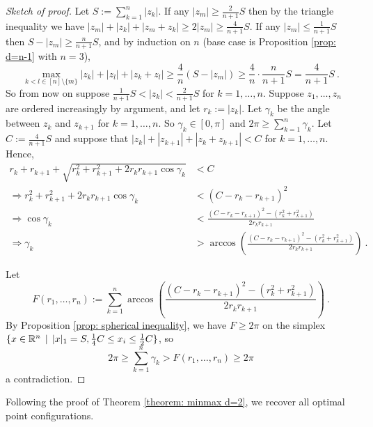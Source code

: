 \documentclass[reqno,hidelinks,11pt]{amsart}
\numberwithin{equation}{section}
\def\RR{\mathbb{R}}
\newcommand{\suchthat}{\;\ifnum\currentgrouptype=16 \middle\fi|\;}
\begin{document}
\begin{proof}[Sketch of proof]
    Let $S:=\sum_{k=1}^n|z_k|$.
    If any $|z_m|\ge\frac2{n+1}S$ then by the triangle inequality we have $|z_m|+|z_k|+|z_m+z_k|\ge2|z_m|\ge\frac4{n+1}S$.
    If any $|z_m|\le\frac1{n+1}S$ then $S-|z_m|\ge\frac{n}{n+1}S$, and by induction on $n$ (base case is Proposition \ref{prop: d=n-1} with $n=3$),
    \[
    \max_{k<l\in[n]\setminus\{m\}} |z_k|+|z_l|+|z_k+z_l|\ge\frac4{n}(S-|z_m|)\ge\frac4{n}\cdot\frac{n}{n+1}S=\frac4{n+1}S~.
    \]
    So from now on suppose $\frac1{n+1}S<|z_k|<\frac2{n+1}S$ for $k=1,\dots,n$.
    Suppose $z_1,\dots,z_n$ are ordered increasingly by argument, and let $r_k:=|z_k|$.
    Let $\gamma_k$ be the angle between $z_k$ and $z_{k+1}$ for $k=1,\dots,n$. So $\gamma_k\in[0,\pi]$ and $2\pi\ge\sum_{k=1}^n\gamma_k$. 
    Let $C:=\frac4{n+1}S$ and suppose that $|z_k|+|z_{k+1}|+|z_k+z_{k+1}|<C$ for $k=1,\dots,n$. Hence,
    \begin{align*}
        r_k+r_{k+1}+\sqrt{r_k^2+r_{k+1}^2+2r_kr_{k+1}\cos\gamma_k} &< C\\
        \Rightarrow r_k^2+r_{k+1}^2+2r_kr_{k+1}\cos\gamma_k &< (C-r_k-r_{k+1})^2\\
        \Rightarrow \cos\gamma_k &< \frac{(C-r_k-r_{k+1})^2-(r_k^2+r_{k+1}^2)}{2r_k r_{k+1}}\\
        \Rightarrow \gamma_k &> \arccos\left(\frac{(C-r_k-r_{k+1})^2-(r_k^2+r_{k+1}^2)}{2r_k r_{k+1}}\right)~.
    \end{align*}

    Let
    \[
    F(r_1,\dots,r_n):=\sum_{k=1}^n \arccos\left(\frac{(C-r_k-r_{k+1})^2-(r_k^2+r_{k+1}^2)}{2r_k r_{k+1}}\right)~.
    \]    
    By Proposition \ref{prop: spherical inequality}, we have $F\ge2\pi$ on the simplex $\{x\in\RR^n\, \suchthat \, |x|_1=S, \frac14C\le x_i\le \frac12C\}$, so
    \[
    2\pi\ge\sum_{k=1}^n\gamma_k>F(r_1,\dots,r_n)\ge2\pi
    \]
    a contradiction.
\end{proof}

Following the proof of Theorem \ref{theorem: minmax d=2}, we recover all optimal point configurations.
\end{document}
